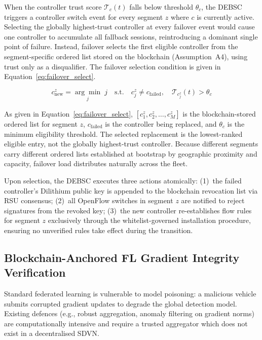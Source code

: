 \documentclass[12pt, a4paper]{report}
\begin{document}
When the controller trust score $\mathcal{T}_c(t)$ falls below
threshold $\theta_c$, the DEBSC triggers a controller switch event
for every segment $z$ where $c$ is currently active. Selecting the
globally highest-trust controller at every failover event would
cause one controller to accumulate all fallback sessions,
reintroducing a dominant single point of failure. Instead, failover
selects the first eligible controller from the segment-specific
ordered list stored on the blockchain (Assumption~A4), using trust
only as a disqualifier. The failover selection condition is given
in Equation~\eqref{eq:failover_select}.

\begin{equation}
\label{eq:failover_select}
c_{\text{new}}^z =
\underset{j}{\arg\min}\; j
\quad \text{s.t.} \quad
c_j^z \neq c_{\text{failed}},\quad
\mathcal{T}_{c_j^z}(t) > \theta_c
\end{equation}

As given in Equation~\eqref{eq:failover_select},
$[c_1^z, c_2^z, \ldots, c_M^z]$ is the blockchain-stored ordered
list for segment $z$, $c_{\text{failed}}$ is the controller being
replaced, and $\theta_c$ is the minimum eligibility threshold.
The selected replacement is the lowest-ranked eligible entry, not
the globally highest-trust controller. Because different segments
carry different ordered lists established at bootstrap by
geographic proximity and capacity, failover load distributes
naturally across the fleet.

Upon selection, the DEBSC executes three actions atomically:
(1)~the failed controller's Dilithium public key is appended to the
blockchain revocation list via RSU consensus; (2)~all OpenFlow
switches in segment $z$ are notified to reject signatures from
the revoked key; (3)~the new controller re-establishes flow rules
for segment $z$ exclusively through the whitelist-governed
installation procedure, ensuring no unverified rules take effect
during the transition.

\subsection{Blockchain-Anchored FL Gradient Integrity Verification}

Standard federated learning is vulnerable to model poisoning: a malicious
vehicle submits corrupted gradient updates to degrade the global detection
model. Existing defences (e.g., robust aggregation, anomaly filtering on
gradient norms) are computationally intensive and require a trusted
aggregator which does not exist in a decentralised SDVN.
\end{document}
